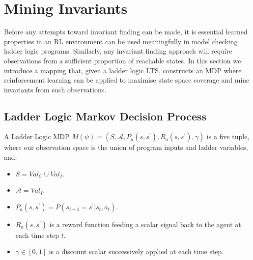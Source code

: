 \documentclass[runningheads]{llncs}
\begin{document}
\section{Mining Invariants} \label{sec:mapping_fm_to_ml}
Before any attempts toward invariant finding can be made, it is essential learned properties in an RL environment can be used meaningfully in model checking ladder logic programs. Similarly, any invariant finding approach will require observations from a sufficient proportion of reachable states. In this section we introduce a mapping that, given a ladder logic LTS, constructs an MDP where reinforcement learning can be applied to maximise state space coverage and mine invariants from such observations.

\subsection{Ladder Logic Markov Decision Process}\label{subsect:MDP} 

\begin{definition}
	A Ladder Logic MDP $M(\psi) = (S,\mathcal{A},P_a(s,s^\prime), R_a(s,s^\prime),\gamma)$ is a five tuple, where our observation space is the union of program inputs and ladder variables, and:
\end{definition}
\begin{itemize}
	\item $S = Val_C \cup Val_I$.
	\item $\mathcal{A} = Val_I$.
	\item $P_a(s,s^\prime) = P(s_{t+1} = s^\prime | s_t, a_t)$.
	\item $R_a(s,s^\prime)$ is a reward function feeding a scalar signal back to the agent at each time step $t$. 
	\item $\gamma \in [0,1]$ is a discount scalar successively applied at each time step.
\end{itemize}
\end{document}
